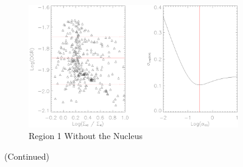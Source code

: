 \begin{figure}
  \ContinuedFloat
  \begin{subfigure}[t]{1\textwidth}
    \centering
    \includegraphics[width=1.\textwidth]{dgr_imgs/region_1-3_aco_output_10.eps}
    \caption{Region 1 Without the Nucleus}
  \end{subfigure}
  \caption{(Continued)}
   \label{fig:dgr_co10}
\end{figure}


